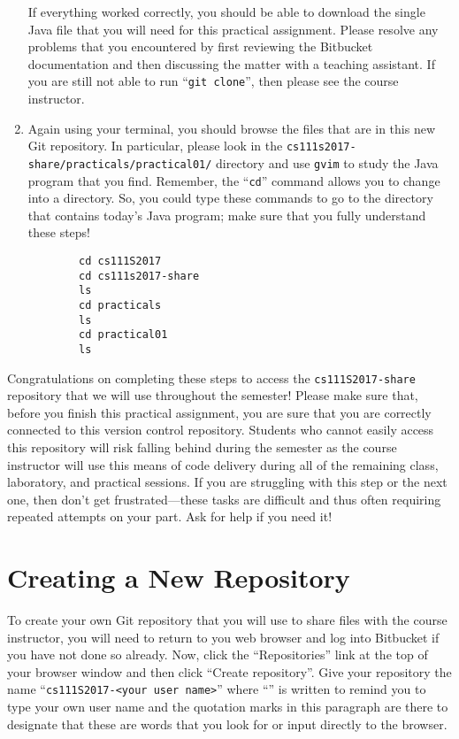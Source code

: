 \begin{enumerate}
    If everything worked correctly, you should be able to download the single Java file that you will need for this
    practical assignment. Please resolve any problems that you encountered by first reviewing the Bitbucket
    documentation and then discussing the matter with a teaching assistant. If you are still not able to run ``{\tt git
    clone}'', then please see the course instructor.

  \item Again using your terminal, you should browse the files that are in this new Git repository. In particular,
    please look in the {\tt cs111s2017-share/practicals/practical01/} directory and use {\tt gvim} to study the Java
    program that you find.  Remember, the ``{\tt cd}'' command allows you to change into a directory. So, you could type
    these commands to go to the directory that contains today's Java program; make sure that you fully understand these
    steps!

    \vspace*{-.1in}
    \begin{verbatim}
        cd cs111S2017
        cd cs111s2017-share
        ls
        cd practicals
        ls
        cd practical01
        ls
    \end{verbatim}
    \vspace*{-.5in}

    \end{enumerate}

    Congratulations on completing these steps to access the {\tt cs111S2017-share} repository that we will use
    throughout the semester! Please make sure that, before you finish this practical assignment, you are sure that you
    are correctly connected to this version control repository. Students who cannot easily access this repository will
    risk falling behind during the semester as the course instructor will use this means of code delivery during all of
    the remaining class, laboratory, and practical sessions. If you are struggling with this step or the next one, then
    don't get frustrated---these tasks are difficult and thus often requiring repeated attempts on your part. Ask for
    help if you need it!

\section*{Creating a New Repository}

To create your own Git repository that you will use to share files with the course instructor, you will need to return
to you web browser and log into Bitbucket if you have not done so already. Now, click the ``Repositories'' link at the
top of your browser window and then click ``Create repository''. Give your repository the name ``{\tt cs111S2017-<your
user name>}'' where ``{\tt <your user name>}'' is written to remind you to type your own user name and the quotation
marks in this paragraph are there to designate that these are words that you look for or input directly to the browser.


